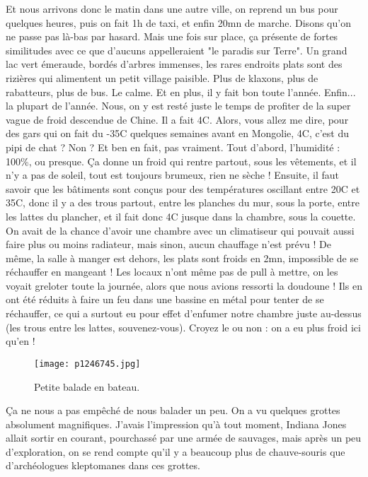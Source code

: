 \documentclass{book}
\begin{document}
Et nous arrivons donc le matin dans une autre ville, on reprend un bus pour quelques heures, puis on fait 1h de taxi, et enfin 20mn de marche. Disons qu'on ne passe pas là-bas par hasard. Mais une fois sur place, ça présente de fortes similitudes avec ce que d'aucuns appelleraient "le paradis sur Terre". Un grand lac vert émeraude, bordés d'arbres immenses, les rares endroits plats sont des rizières qui alimentent un petit village paisible. Plus de klaxons, plus de rabatteurs, plus de bus. Le calme. Et en plus, il y fait bon toute l'année. Enfin... la plupart de l'année. Nous, on y est resté juste le temps de profiter de la super vague de froid descendue de Chine. Il a fait 4\textdegree C. Alors, vous allez me dire, pour des gars qui on fait du -35\textdegree C quelques semaines avant en Mongolie, 4\textdegree C, c'est du pipi de chat ? Non ? Et ben en fait, pas vraiment. Tout d'abord, l'humidité : 100\%, ou presque. Ça donne un froid qui rentre partout, sous les vêtements, et il n'y a pas de soleil, tout est toujours brumeux, rien ne sèche ! Ensuite, il faut savoir que les bâtiments sont conçus pour des températures oscillant entre 20\textdegree C et 35\textdegree C, donc il y a des trous partout, entre les planches du mur, sous la porte, entre les lattes du plancher, et il fait donc 4\textdegree C jusque dans la chambre, sous la couette. On avait de la chance d'avoir une chambre avec un climatiseur qui pouvait aussi faire plus ou moins radiateur, mais sinon, aucun chauffage n'est prévu ! De même, la salle à manger est dehors, les plats sont froids en 2mn, impossible de se réchauffer en mangeant ! Les locaux n'ont même pas de pull à mettre, on les voyait greloter toute la journée, alors que nous avions ressorti la doudoune ! Ils en ont été réduits à faire un feu dans une bassine en métal pour tenter de se réchauffer, ce qui a surtout eu pour effet d'enfumer notre chambre juste au-dessus (les trous entre les lattes, souvenez-vous). Croyez le ou non : on a eu plus froid ici qu'en  !




\begin{figure}[h]
\centering
\texttt{[image: p1246745.jpg]}
\caption*{Petite balade en bateau.}
\end{figure}

Ça ne nous a pas empêché de nous balader un peu. On a vu quelques grottes absolument magnifiques. J'avais l'impression qu'à tout moment, Indiana Jones allait sortir en courant, pourchassé par une armée de sauvages, mais après un peu d'exploration, on se rend compte qu'il y a beaucoup plus de chauve-souris que d'archéologues kleptomanes dans ces grottes.
\end{document}
